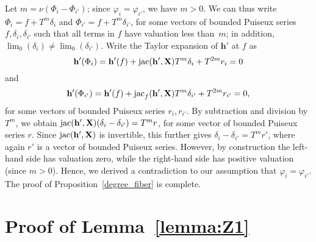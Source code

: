 \documentclass[11pt]{article}
\numberwithin{Property}{section}
\numberwithin{Theorem}{section}
\numberwithin{Proposition}{section}
\numberwithin{Lemma}{section}
\numberwithin{Corollary}{section}
\numberwithin{Definition}{section}
\numberwithin{Remark}{section}
\numberwithin{Conjecture}{section}
\numberwithin{Problem}{section}
\numberwithin{Claim}{section}
\theoremstyle{definition}
\numberwithin{Example}{section}
\def\h {\ensuremath{\mathbf{h}}}
\newcommand{\mat}[1]{\mathbf{\MakeUppercase{#1}}} %
\begin{document}
Let $m=\nu(\Phi_i-\Phi_{i'})$; since  $\varphi_i = \varphi_{i'}$, we have
$m > 0$. We can thus write $\Phi_i=f + T^m
\delta_i$ and $\Phi_{i'}=f + T^m \delta_{i'}$, for some vectors of
bounded Puiseux series $f, \delta_i, \delta_{i'}$ such that all terms
in $f$ have valuation less than~$m$; in addition, $\lim_0(\delta_i)
\ne \lim_0(\delta_{i'})$. Write the Taylor expansion of $\h'$ at $f$ as
$$\h'(\Phi_i) = \h'(f) + \mathrm{jac}(\h',\mat{X}) T^m \delta_i + T^{2m} r_i =0$$
and
$$\h'(\Phi_{i'}) = \h'(f) + \mathrm{jac}_f(\h',\mat{X}) T^m \delta_{i'} + T^{2m}
r_{i'} =0,$$ for some vectors of bounded Puiseux series $r_i,r_{i'}$.
By subtraction and division by $T^m$, we obtain $\mathrm{jac}(\h',\mat{X})
(\delta_i-\delta_{i'}) = T^m r$, for some vector of bounded Puiseux
series $r$.  Since $\mathrm{jac}(\h',\mat{X})$ is invertible, this further gives
$\delta_i-\delta_{i'} = T^m r'$, where again $r'$ is a vector of
bounded Puiseux series.  However, by construction the left-hand side
has valuation zero, while the right-hand side has positive valuation
(since $m > 0$). Hence, we derived a contradiction to our assumption
that $\varphi_i = \varphi_{i'}$. The proof of Proposition~\ref{degree_fiber} is
complete.

\section{Proof of Lemma~\ref{lemma:Z1}}
\label{sec:proofZ1}
\end{document}
